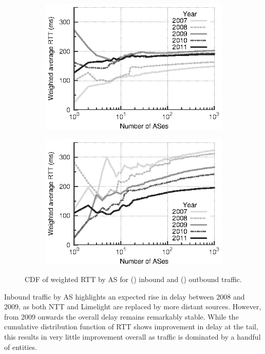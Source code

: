 \begin{figure}
    \centering
    \begin{subfigure}[b]{0.5\linewidth}
        \centering
        \includegraphics{figures/malawi/rtt_wcdf_in}
        \caption{\label{fig:rtt_wcdf_in}}
    \end{subfigure}%
    \begin{subfigure}[b]{0.5\linewidth}
        \centering
        \includegraphics{figures/malawi/rtt_wcdf_out}
        \caption{\label{fig:rtt_wcdf_out}}
    \end{subfigure}%
    \caption[\acs{CDF} of weighted \acs{RTT} by \acs{AS}.]{\acs{CDF} of weighted \acs{RTT} by \acs{AS} for () inbound and () outbound traffic. \label{fig:rtt_wcdf}}
\end{figure}

Inbound traffic by \ac{AS} highlights an expected rise in delay between 2008 and 2009, as both \acs{NTT} and Limelight are replaced by more distant sources. 
However, from 2009 onwards the overall delay remains remarkably stable. 
While the cumulative distribution function of \ac{RTT} shows improvement in delay at the tail, this results in very little improvement overall as traffic is dominated by a handful of entities.

